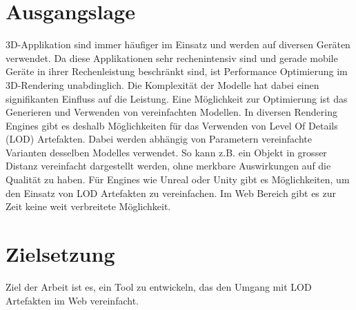 \section{Ausgangslage}
3D-Applikation sind immer häufiger im Einsatz und werden auf diversen Geräten verwendet. Da diese Applikationen sehr rechenintensiv sind und gerade mobile Geräte in ihrer Rechenleistung beschränkt sind, ist Performance Optimierung im 3D-Rendering unabdinglich. Die Komplexität der Modelle hat dabei einen signifikanten Einfluss auf die Leistung.
Eine Möglichkeit zur Optimierung ist das Generieren und Verwenden von vereinfachten Modellen. In diversen Rendering Engines gibt es deshalb Möglichkeiten für das Verwenden von Level Of Details (LOD) Artefakten. Dabei werden abhängig von Parametern vereinfachte Varianten desselben Modelles verwendet. So kann z.B. ein Objekt in grosser Distanz vereinfacht dargestellt werden, ohne merkbare Auswirkungen auf die Qualität zu haben.
Für Engines wie Unreal oder Unity gibt es Möglichkeiten, um den Einsatz von LOD Artefakten zu vereinfachen. Im Web Bereich gibt es zur Zeit keine weit verbreitete Möglichkeit.

\section{Zielsetzung}
Ziel der Arbeit ist es, ein Tool zu entwickeln, das den Umgang mit LOD Artefakten im Web vereinfacht.
